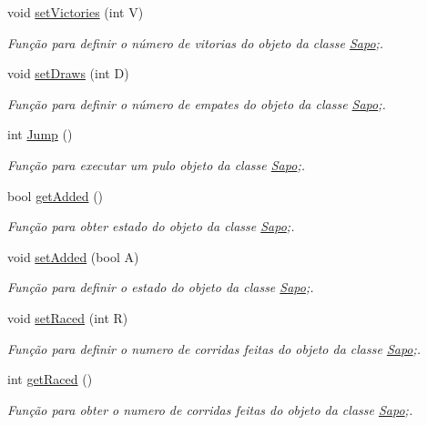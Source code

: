 \begin{DoxyCompactItemize}
void \mbox{\hyperlink{class_sapo_a2b559f3706b66759c13bed2c8ed6eac5}{set\+Victories}} (int V)
\begin{DoxyCompactList}\small\item\em Função para definir o número de vitorias do objeto da classe \mbox{\hyperlink{class_sapo}{Sapo}};. \end{DoxyCompactList}\item 
void \mbox{\hyperlink{class_sapo_a5b4e93e3210e13e5513c99ffea5a8d48}{set\+Draws}} (int D)
\begin{DoxyCompactList}\small\item\em Função para definir o número de empates do objeto da classe \mbox{\hyperlink{class_sapo}{Sapo}};. \end{DoxyCompactList}\item 
int \mbox{\hyperlink{class_sapo_ae9f85bbb030b0b4e7a47ed2448e688e4}{Jump}} ()
\begin{DoxyCompactList}\small\item\em Função para executar um pulo objeto da classe \mbox{\hyperlink{class_sapo}{Sapo}};. \end{DoxyCompactList}\item 
bool \mbox{\hyperlink{class_sapo_a34fd2f0dd3e7fd8ed92a367e49a744b9}{get\+Added}} ()
\begin{DoxyCompactList}\small\item\em Função para obter estado do objeto da classe \mbox{\hyperlink{class_sapo}{Sapo}};. \end{DoxyCompactList}\item 
void \mbox{\hyperlink{class_sapo_a4998802c220373e4c6a099d752d9fa69}{set\+Added}} (bool A)
\begin{DoxyCompactList}\small\item\em Função para definir o estado do objeto da classe \mbox{\hyperlink{class_sapo}{Sapo}};. \end{DoxyCompactList}\item 
void \mbox{\hyperlink{class_sapo_a64d35acf5942677a72cb0db282ba60b7}{set\+Raced}} (int R)
\begin{DoxyCompactList}\small\item\em Função para definir o numero de corridas feitas do objeto da classe \mbox{\hyperlink{class_sapo}{Sapo}};. \end{DoxyCompactList}\item 
int \mbox{\hyperlink{class_sapo_a1a37dd6a785b8ac2fef0f29832856d77}{get\+Raced}} ()
\begin{DoxyCompactList}\small\item\em Função para obter o numero de corridas feitas do objeto da classe \mbox{\hyperlink{class_sapo}{Sapo}};. \end{DoxyCompactList}\end{DoxyCompactItemize}

